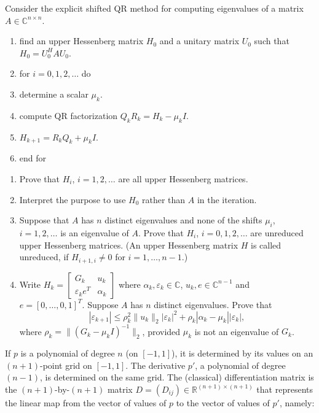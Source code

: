\documentclass[11pt,a4paper]{article}
\newcommand{\examstatement}[1]{%
  \par\addvspace{0.85em}%
  \noindent{\bfseries #1}\par\nobreak\addvspace{0.28em}%
}
\begin{document}
\examstatement{Problem 2.}
Consider the explicit shifted QR method for computing eigenvalues of a matrix \(A \in \mathbb{C}^{n \times n}\).
\begin{enumerate}[label=\arabic*:,leftmargin=2em]
    \item find an upper Hessenberg matrix \(H_{0}\) and a unitary matrix \(U_{0}\) such that \(H_{0} = U_{0}^{H} A U_{0}\).
    \item for \(i = 0, 1, 2, \dots\) do
    \item determine a scalar \(\mu_{k}\).
    \item compute QR factorization \(Q_{k} R_{k} = H_{k} - \mu_{k} I\).
    \item \(H_{k+1} = R_{k} Q_{k} + \mu_{k} I\).
    \item end for
\end{enumerate}
\begin{enumerate}[label=(\arabic*)]
    \item Prove that \(H_{i}\), \(i = 1, 2, \dots\) are all upper Hessenberg matrices.
    \item Interpret the purpose to use \(H_{0}\) rather than \(A\) in the iteration.
    \item Suppose that \(A\) has \(n\) distinct eigenvalues and none of the shifts \(\mu_{i}\), \(i = 1, 2, \dots\) is an eigenvalue of \(A\). Prove that \(H_{i}\), \(i = 0, 1, 2, \dots\) are unreduced upper Hessenberg matrices. (An upper Hessenberg matrix \(H\) is called unreduced, if \(H_{i+1,i} \neq 0\) for \(i = 1, \dots, n-1\).)
    \item Write \(H_{k} = \begin{bmatrix} G_{k} & u_{k} \\ \varepsilon_{k} e^{T} & \alpha_{k} \end{bmatrix}\) where \(\alpha_{k}, \varepsilon_{k} \in \mathbb{C}\), \(u_{k}, e \in \mathbb{C}^{n-1}\) and \(e = [0, \dots, 0, 1]^{T}\). Suppose \(A\) has \(n\) distinct eigenvalues. Prove that
    \[
    |\varepsilon_{k+1}| \le \rho_{k}^{2} \|u_{k}\|_{2} |\varepsilon_{k}|^{2} + \rho_{k} |\alpha_{k} - \mu_{k}| |\varepsilon_{k}|,
    \]
    where \(\rho_{k} = \|(G_{k} - \mu_{k} I)^{-1}\|_{2}\), provided \(\mu_{k}\) is not an eigenvalue of \(G_{k}\).
\end{enumerate}

\examstatement{Problem 3.}
If \(p\) is a polynomial of degree \(n\) (on \([-1, 1]\)), it is determined by its values on an \((n+1)\)-point grid on \([-1, 1]\). The derivative \(p'\), a polynomial of degree \((n-1)\), is determined on the same grid. The (classical) differentiation matrix is the \((n+1)\)-by-\((n+1)\) matrix \(D = (D_{ij}) \in \mathbb{R}^{(n+1) \times (n+1)}\) that represents the linear map from the vector of values of \(p\) to the vector of values of \(p'\), namely:
\end{document}
